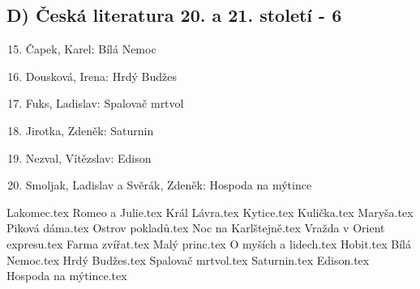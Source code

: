 \documentclass[11pt]{article}
\begin{document}
        \subsection*{D)	Česká literatura 20. a 21. století - 6}
            \begin{enumerate}
                \setcounter{enumi}{14}
                \item Čapek, Karel: Bílá Nemoc
                \item Dousková, Irena: Hrdý Budžes
                \item Fuks, Ladislav: Spalovač mrtvol
                \item Jirotka, Zdeněk: Saturnin
                \item Nezval, Vítězslav: Edison
                \item Smoljak, Ladislav a Svěrák, Zdeněk: Hospoda na mýtince
            \end{enumerate}

    \newpage
    {Lakomec.tex}
    \newpage
    {Romeo a Julie.tex}
    \newpage
    {Král Lávra.tex}
    \newpage
    {Kytice.tex}
    \newpage
    {Kulička.tex}
    \newpage
    {Maryša.tex}
    \newpage
    {Piková dáma.tex}
    \newpage
    {Ostrov pokladů.tex}
    \newpage
    {Noc na Karlštejně.tex}
    \newpage
    {Vražda v Orient expresu.tex}
    \newpage
    {Farma zvířat.tex}
    \newpage
    {Malý princ.tex}
    \newpage
    {O myších a lidech.tex}
    \newpage
    {Hobit.tex}
    \newpage
    {Bílá Nemoc.tex}
    \newpage
    {Hrdý Budžes.tex}
    \newpage
    {Spalovač mrtvol.tex}
    \newpage
    {Saturnin.tex}
    \newpage
    {Edison.tex}
    \newpage
    {Hospoda na mýtince.tex}
    \newpage
\end{document}
